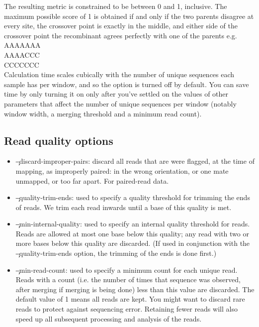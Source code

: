 \begin{itemize}
The resulting metric is constrained to be between 0 and 1, inclusive.
The maximum possible score of 1 is obtained if and only if the two parents disagree at every site, the crossover point is exactly in the middle, and either side of the crossover point the recombinant agrees perfectly with one of the parents e.g.\\
AAAAAAA\\
AAAACCC\\
CCCCCCC\\
Calculation time scales cubically with the number of unique sequences each sample has per window, and so the option is turned off by default.
You can save time by only turning it on only after you've settled on the values of other parameters that affect the number of unique sequences per window (notably window width, a merging threshold and a minimum read count).
\end{itemize}

\subsection{Read quality options}
\begin{itemize}
\item \c{--discard-improper-pairs}: discard all reads that are were flagged, at the time of mapping, as improperly paired: in the wrong orientation, or one mate unmapped, or too far apart.
For paired-read data.
\item \c{--quality-trim-ends}: used to specify a quality threshold for trimming the ends of reads.
We trim each read inwards until a base of this quality is met.
\item \c{--min-internal-quality}: used to specify an internal quality threshold for reads.
Reads are allowed at most one base below this quality; any read with two or more bases below this quality are discarded.
(If used in conjunction with the \c{--quality-trim-ends option}, the trimming of the ends is done first.)
\item \c{--min-read-count}: used to specify a minimum count for each unique read.
Reads with a count (i.e. the number of times that sequence was observed, after merging if merging is being done) less than this value are discarded.
The default value of 1 means all reads are kept.
You might want to discard rare reads to protect against sequencing error.
Retaining fewer reads will also speed up all subsequent processing and analysis of the reads.
\end{itemize}

